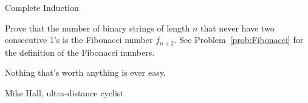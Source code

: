 \begin{section}{Complete Induction}
\begin{problem}
Prove that the number of binary strings of length $n$ that never have two consecutive 1's is the Fibonacci number $f_{n+2}$.  See Problem~\ref{prob:Fibonacci} for the definition of the Fibonacci numbers.
\end{problem}

\epigraph{Nothing that's worth anything is ever easy.}{Mike Hall, ultra-distance cyclist}

\end{section}